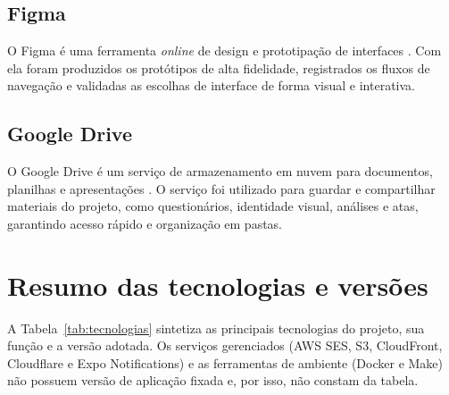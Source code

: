         \subsection{Figma}
            O Figma é uma ferramenta \textit{online} de design e prototipação de interfaces \cite{figma_site}. Com ela foram produzidos os protótipos de alta fidelidade, registrados os fluxos de navegação e validadas as escolhas de interface de forma visual e interativa.

        \subsection{Google Drive}
            O Google Drive é um serviço de armazenamento em nuvem para documentos, planilhas e apresentações \cite{drive_workspace}. O serviço foi utilizado para guardar e compartilhar materiais do projeto, como questionários, identidade visual, análises e atas, garantindo acesso rápido e organização em pastas.

    \section{Resumo das tecnologias e versões}

        A Tabela~\ref{tab:tecnologias} sintetiza as principais tecnologias do projeto, sua função e a versão adotada. Os serviços gerenciados (AWS SES, S3, CloudFront, Cloudflare e Expo Notifications) e as ferramentas de ambiente (Docker e Make) não possuem versão de aplicação fixada e, por isso, não constam da tabela.

